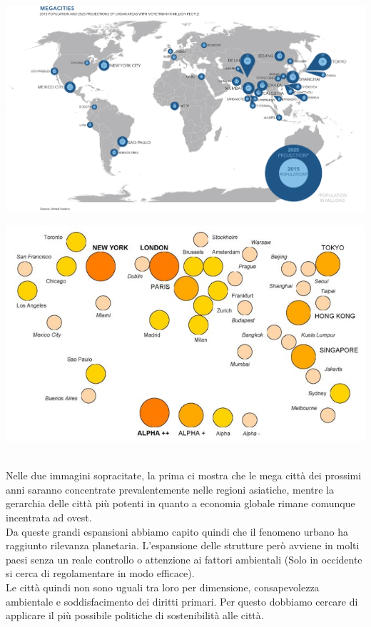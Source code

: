 \documentclass[a4paper,12pt, oneside]{book}
\begin{document}
 \begin{center}
  \begin{minipage}{0.48\linewidth}
    \includegraphics[width=\linewidth]{"Immagini/Megacities"}
    \label{fig:megacities}
  \end{minipage}%
\hfill
  \begin{minipage}{0.46\linewidth}
    \includegraphics[width=\linewidth]{"Immagini/alpha2004c"}
    \label{fig:alphacities}
  \end{minipage}
\end{center}
\leavevmode\\
Nelle due immagini sopracitate, la prima ci mostra che le mega città dei prossimi anni saranno concentrate prevalentemente nelle regioni asiatiche, mentre la gerarchia delle città più potenti in quanto a economia globale rimane comunque incentrata ad ovest.\\
Da queste grandi espansioni abbiamo capito quindi che il fenomeno urbano ha raggiunto rilevanza planetaria. L'espansione delle strutture però avviene in molti paesi senza un reale controllo o attenzione ai fattori ambientali (Solo in occidente si cerca di regolamentare in modo efficace).\\
Le città quindi non sono uguali tra loro per dimensione, consapevolezza ambientale e soddisfacimento dei diritti primari. Per questo dobbiamo cercare di applicare il più possibile politiche di sostenibilità alle città.\\
\end{document}
